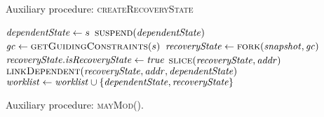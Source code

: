 \begin{algorithm}
  \caption{Auxiliary procedure: \textsc{createRecoveryState}
  \label{fig:aux-func-recS}}
\begin{algorithmic}[1]

   \label{alg:recover-foreach}
     \label{alg:recover-if-found}
       \State $\mathit{dependentState} \gets s$ \label{alg:recover-gen-depS}
       \State $\Call{suspend}{\dependentState}$ \label{alg:recover-suspend}
       \State $\gc \gets  \Call{getGuidingConstraints}{\workstate}$ \label{alg:recover-get-gc}
       \State $\recoveryState \gets \Call{fork}{\snapshot,\gc}$ \label{alg:recover-gen-recS}
       \State $\mathit{recoveryState}.\mathit{isRecoveryState} \gets \mathit{true}$ \label{alg:recover-set-is-recS}
       \State $\Call{slice}{\recoveryState,\addr}$ \label{alg:recover-slice}
       \State $\Call{linkDependent}{\recoveryState,\addr,\dependentState}$ \label{alg:recover-record-dep}
       \State $\mathit{worklist}  \gets  \mathit{worklist}  \cup \{\mathit{dependentState},\mathit{recoveryState}\}$
       \label{alg:push-worklist-recovery}
    \EndIf
  \EndFor
\EndFunction
\end{algorithmic}
\end{algorithm}

\begin{algorithm}
  \caption{Auxiliary procedure: \textsc{mayMod}().
  \label{fig:aux-func-may-mod}}
\begin{algorithmic}[1]


     \label{alg:maymod-static}
      \If{$\addr\not\in\owset$}  \label{alg:maymod-dynamic}
         \State {}
       \EndIf
    \EndIf
  \EndFor
  \State {}
\EndFunction

\end{algorithmic}
\end{algorithm}


